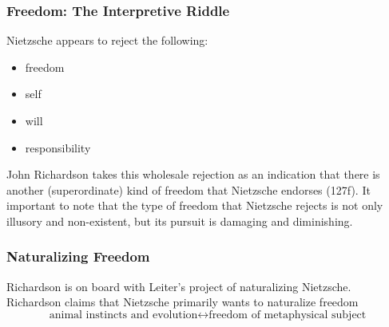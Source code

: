 \documentclass[xcolor=dvipsnames]{beamer}
\begin{document}

\begin{frame}
  \frametitle{Freedom: The Interpretive Riddle}
  Nietzsche appears to reject the following:
  \begin{itemize}
  \item freedom
  \item self
  \item will
  \item responsibility
  \end{itemize}
  John Richardson takes this wholesale rejection as an indication that
  there is another (superordinate) kind of freedom that Nietzsche
  endorses (127f). It important to note that the type of freedom that
  Nietzsche rejects is not only illusory and non-existent, but its
  pursuit is damaging and diminishing.
\end{frame}

\begin{frame}
  \frametitle{Naturalizing Freedom}
  Richardson is on board with Leiter's project of naturalizing
  Nietzsche. Richardson claims that Nietzsche primarily wants to
  naturalize freedom
  \begin{equation}
    \label{eq:uatheezu}
    \mbox{animal instincts and
      evolution}\longleftrightarrow\mbox{freedom of metaphysical subject}
  \end{equation}
\end{frame}
\end{document}
